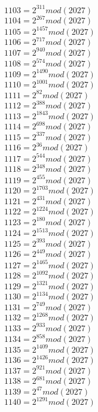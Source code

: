 \documentclass[12pt, letterpaper]{article}
\begin{document}
\begin{itemize}
\begin{multicols}{3}
$1103= 2^{311} mod (2027)$\\
$1104= 2^{267} mod (2027)$\\
$1105= 2^{1457} mod (2027)$\\
$1106= 2^{717} mod (2027)$\\
$1107= 2^{940} mod (2027)$\\
$1108= 2^{574} mod (2027)$\\
$1109= 2^{1490} mod (2027)$\\
$1110= 2^{1001} mod (2027)$\\
$1111= 2^{82} mod (2027)$\\
$1112= 2^{388} mod (2027)$\\
$1113= 2^{1843} mod (2027)$\\
$1114= 2^{698} mod (2027)$\\
$1115= 2^{337} mod (2027)$\\
$1116= 2^{36} mod (2027)$\\
$1117= 2^{544} mod (2027)$\\
$1118= 2^{348} mod (2027)$\\
$1119= 2^{455} mod (2027)$\\
$1120= 2^{1703} mod (2027)$\\
$1121= 2^{431} mod (2027)$\\
$1122= 2^{1224} mod (2027)$\\
$1123= 2^{180} mod (2027)$\\
$1124= 2^{1513} mod (2027)$\\
$1125= 2^{393} mod (2027)$\\
$1126= 2^{449} mod (2027)$\\
$1127= 2^{1465} mod (2027)$\\
$1128= 2^{1092} mod (2027)$\\
$1129= 2^{1321} mod (2027)$\\
$1130= 2^{1134} mod (2027)$\\
$1131= 2^{749} mod (2027)$\\
$1132= 2^{1268} mod (2027)$\\
$1133= 2^{933} mod (2027)$\\
$1134= 2^{858} mod (2027)$\\
$1135= 2^{1409} mod (2027)$\\
$1136= 2^{1426} mod (2027)$\\
$1137= 2^{921} mod (2027)$\\
$1138= 2^{681} mod (2027)$\\
$1139= 2^{47} mod (2027)$\\
$1140= 2^{1291} mod (2027)$\\

\end{multicols}
\end{itemize}
\end{document}
